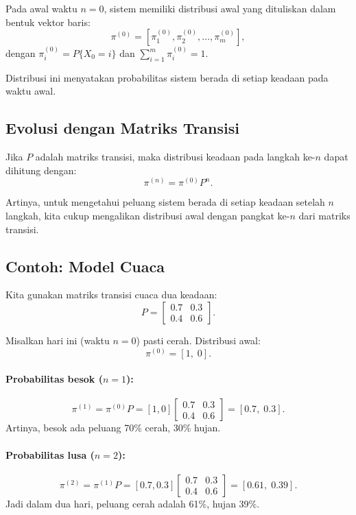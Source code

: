 \documentclass{bukumjh}
\begin{document}
Pada awal waktu $n=0$, sistem memiliki {\jsg distribusi awal} yang dituliskan dalam bentuk vektor baris:
\[
\pi^{(0)} = [ \pi_1^{(0)}, \pi_2^{(0)}, \dots, \pi_m^{(0)} ],
\]
dengan $\pi_i^{(0)} = P\{X_0 = i\}$ dan $\sum_{i=1}^m \pi_i^{(0)} = 1$.

Distribusi ini menyatakan probabilitas sistem berada di setiap keadaan pada waktu awal.

\subsection{Evolusi dengan Matriks Transisi}

Jika $P$ adalah matriks transisi, maka distribusi keadaan pada langkah ke-$n$ dapat dihitung dengan:
\[
\pi^{(n)} = \pi^{(0)} P^n.
\]

Artinya, untuk mengetahui peluang sistem berada di setiap keadaan setelah $n$ langkah, kita cukup mengalikan distribusi awal dengan pangkat ke-$n$ dari matriks transisi.

\subsection{Contoh: Model Cuaca}

Kita gunakan matriks transisi cuaca dua keadaan:
\[
P =
\begin{bmatrix}
0.7 & 0.3 \\
0.4 & 0.6
\end{bmatrix}.
\]

Misalkan hari ini (waktu $n=0$) pasti cerah. Distribusi awal:
\[
\pi^{(0)} = [1, \; 0].
\]

\paragraph{Probabilitas besok ($n=1$):}
\[
\pi^{(1)} = \pi^{(0)} P = [1,0] 
\begin{bmatrix}
0.7 & 0.3 \\
0.4 & 0.6
\end{bmatrix}
= [0.7, \; 0.3].
\]
Artinya, besok ada peluang 70\% cerah, 30\% hujan.

\paragraph{Probabilitas lusa ($n=2$):}
\[
\pi^{(2)} = \pi^{(1)} P = [0.7, 0.3] 
\begin{bmatrix}
0.7 & 0.3 \\
0.4 & 0.6
\end{bmatrix}
= [0.61, \; 0.39].
\]
Jadi dalam dua hari, peluang cerah adalah 61\%, hujan 39\%.
\end{document}
